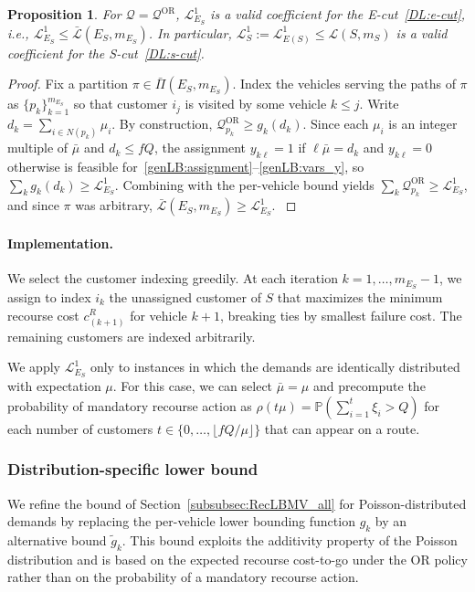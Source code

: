 \documentclass{article}
\newtheorem{proposition}{Proposition}
\newcommand{\rev}[1]{{\color{black}#1}}
\begin{document}
\begin{proposition}\label{prop:LB1}
For $\mathcal{Q}=\mathcal{Q}^{\mathrm{OR}}$, $\mathcal{L}^1_{E_S}$ is a valid coefficient for the E-cut~\eqref{DL:e-cut}, i.e., $\mathcal{L}^1_{E_S} \leq \bar{\mathcal{L}}(E_S,m_{E_S})$. \rev{In particular, $\mathcal{L}^1_S := \mathcal{L}^1_{E(S)} \leq \mathcal{L}(S,m_S)$ is a valid coefficient for the S-cut~\eqref{DL:s-cut}.}
\end{proposition}

\begin{proof}\rev{
    Fix a partition $\pi \in \bar\Pi(E_S, m_{E_S})$. Index the vehicles serving the paths of $\pi$ as $\{p_k\}_{k=1}^{m_{E_S}}$ so that customer $i_j$ is visited by some vehicle $k \leq j$. Write $d_k = \sum_{i \in N(p_k)} \mu_i$. By construction, $\mathcal{Q}^{\mathrm{OR}}_{p_k} \geq g_k(d_k)$. Since each $\mu_i$ is an integer multiple of $\bar\mu$ and $d_k \leq fQ$, the assignment $y_{k\ell} = 1$ if $\ell\bar\mu = d_k$ and $y_{k\ell} = 0$ otherwise is feasible for~\eqref{genLB:assignment}--\eqref{genLB:vars_y}, so $\sum_k g_k(d_k) \geq \mathcal{L}^1_{E_S}$. Combining with the per-vehicle bound yields $\sum_k \mathcal{Q}^{\mathrm{OR}}_{p_k} \geq \mathcal{L}^1_{E_S}$, and since $\pi$ was arbitrary, $\bar{\mathcal{L}}(E_S, m_{E_S}) \geq \mathcal{L}^1_{E_S}$. }
\end{proof}

\paragraph{Implementation.}
We select the customer indexing greedily. At each iteration $k = 1,\dots,m_{E_S}-1$, we assign to index $i_k$ the unassigned customer of $S$ that maximizes the minimum recourse cost $c^R_{(k+1)}$ for vehicle $k+1$, breaking ties by smallest failure cost. The remaining customers are indexed arbitrarily. 

We apply $\mathcal{L}^1_{E_S}$ only to instances in which the demands are identically distributed with expectation $\mu$. For this case, we can select $\bar\mu = \mu$ and precompute the probability of mandatory recourse action as $\rho(t\mu) = \mathds{P}\!\left(\sum_{i=1}^t \xi_i > Q\right)$ for each number of customers $t \in \{0, \dots, \lfloor fQ/\mu \rfloor\}$ that can appear on a route.

\subsubsection{Distribution-specific lower bound} \label{subsubsec:RecLBMV_poisson}
\rev{We refine the bound of Section~\ref{subsubsec:RecLBMV_all} for Poisson-distributed demands by replacing the per-vehicle lower bounding function $g_k$ by an alternative bound $\widetilde{g}_k$. This bound exploits the additivity property of the Poisson distribution and is based on the expected recourse cost-to-go under the OR policy rather than on the probability of a mandatory recourse action.}
 
\end{document}
